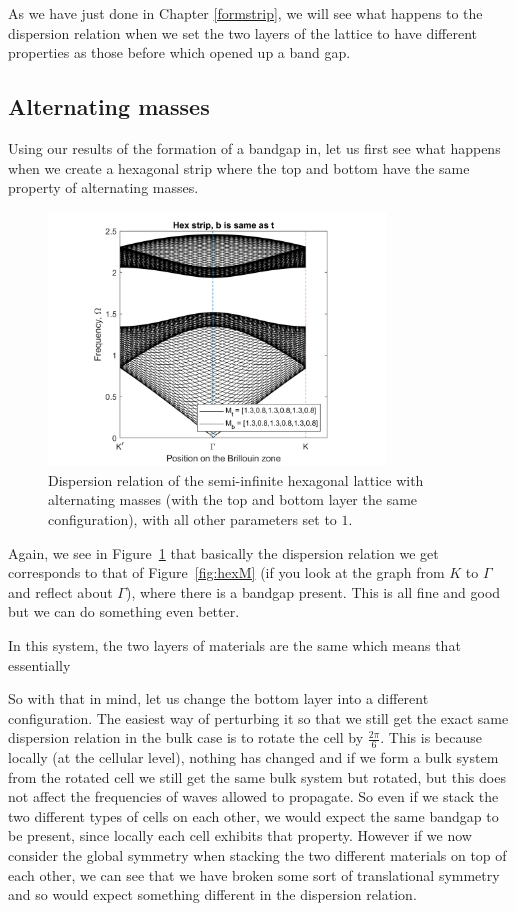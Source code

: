 As we have just done in Chapter \ref{formstrip}, we will see what happens to
the dispersion relation when we set the two layers of the lattice to have
different properties as those before which opened up a band gap.

\subsection{Alternating masses}
\label{perturbaltmass}
Using our results of the formation of a bandgap in, let us first see what
happens when we create a hexagonal strip where the top and bottom have the same
property of alternating masses. 

\begin{figure}[!h]
\centering
\includegraphics[width=0.8\textwidth]{imgs/hexstripperturbM.png}
\caption{\label{fig:hexstripM} Dispersion relation of the semi-infinite
  hexagonal lattice with alternating masses (with the top and bottom layer the
  same configuration), with all other parameters set to $1$.}
\end{figure}

Again, we see in Figure~\ref{fig:hexstripM} that basically the dispersion
relation we get corresponds to that of Figure~\ref{fig:hexM} (if you look at
the graph from $K$ to $\Gamma$ and reflect about $\Gamma$), where there is a
bandgap present. This is all fine and good but we can do something even better.

In this system, the two layers of materials are the same which means that
essentially

So with that in mind, let us change the bottom layer into a different
configuration. The easiest way of perturbing it so that we still get the exact
same dispersion relation in the bulk case is to rotate the cell by
$\frac{2\pi}{6}$. This is because locally (at the cellular level), nothing has
changed and if we form a bulk system from the rotated cell we still get the
same bulk system but rotated, but this does not affect the frequencies of waves
allowed to propagate. So even if we stack the two different types of cells on
each other, we would expect the same bandgap to be present, since locally each
cell exhibits that property. However if we now consider the global symmetry
when stacking the two different materials on top of each other, we can see that
we have broken some sort of translational symmetry and so would expect
something different in the dispersion relation.

